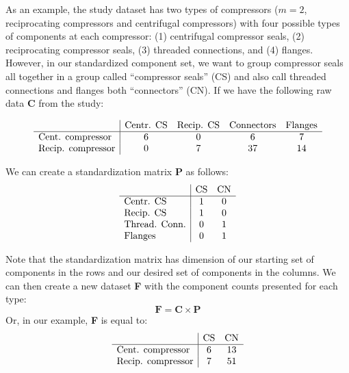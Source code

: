 \documentclass[11pt]{report}
\begin{document}
As an example, the study dataset has two types of compressors ($m=2$, reciprocating compressors and centrifugal compressors) with four possible types of components at each compressor: (1) centrifugal compressor seals, (2) reciprocating compressor seals, (3) threaded connections, and (4) flanges.  However, in our standardized component set, we want to group compressor seals all together in a group called ``compressor seals'' (CS) and also call threaded connections and flanges both ``connectors'' (CN).  If we have the following raw data $\textbf{C}$ from the study:

\begin{equation}
\begin{array}{l | cccc}
 						&\textrm{Centr. CS}	& \textrm{Recip. CS}	& \textrm{Connectors}	& \textrm{Flanges} \\
						\hline
\textrm{Cent. compressor}		&6			& 0			& 6					& 7 \\
\textrm{Recip. compressor}	&0			& 7			& 37					& 14 \\
\end{array}
\end{equation}

We can create a standardization matrix $\textbf{P}$ as follows:
\begin{equation}
\begin{array}{l | cc}
 			&	\textrm{CS}&	\textrm{CN} \\
				\hline
\textrm{Centr. CS}		&	1 &	0 \\
\textrm{Recip. CS}		&	1&	0 \\
\textrm{Thread. Conn.}	&	0&	1 \\
\textrm{Flanges}		&	0&	1 
\end{array}
\end{equation}

Note that the standardization matrix has dimension of our starting set of components in the rows and our desired set of components in the columns.  We can then create a new dataset \textbf{F} with the component counts presented for each type:
\begin{equation}
\textbf{F} = \textbf{C} \times \textbf{P}
\end{equation}
Or, in our example, \textbf{F} is equal to:
\begin{equation}
\begin{array}{l | cc}
		
 					&	\textrm{CS} &	\textrm{CN} \\
						\hline
\textrm{Cent. compressor} &		6	& 13 \\
\textrm{Recip. compressor} &		7	& 51 \\
\end{array}
\end{equation}
\end{document}
